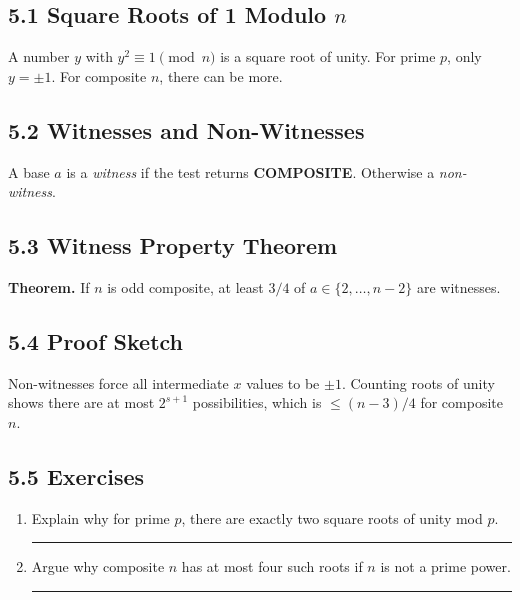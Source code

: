 \documentclass[12pt]{article}
\begin{document}
\subsection{5.1 Square Roots of 1 Modulo $n$}
A number $y$ with $y^2\equiv1\pmod n$ is a square root of unity.  For prime $p$, only $y=\pm1$.  For composite $n$, there can be more.

\subsection{5.2 Witnesses and Non-Witnesses}
A base $a$ is a \emph{witness} if the test returns \textbf{COMPOSITE}.  Otherwise a \emph{non-witness}.

\subsection{5.3 Witness Property Theorem}
\textbf{Theorem.} If $n$ is odd composite, at least $3/4$ of $a\in\{2,\dots,n-2\}$ are witnesses.  

\subsection{5.4 Proof Sketch}
Non-witnesses force all intermediate $x$ values to be $\pm1$.  Counting roots of unity shows there are at most $2^{s+1}$ possibilities, which is $\le(n-3)/4$ for composite $n$.

\subsection{5.5 Exercises}
\begin{enumerate}[label=Exercise 5.\arabic*]
  \item Explain why for prime $p$, there are exactly two square roots of unity mod $p$.\rule{6cm}{0.4pt}
  \item Argue why composite $n$ has at most four such roots if $n$ is not a prime power.\rule{6cm}{0.4pt}
\end{enumerate}
\end{document}
